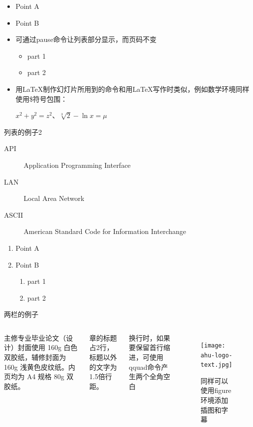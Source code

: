 \documentclass[aspectratio=169]{ahu-slide}
\begin{document}
\begin{frame}{}
    \begin{itemize}
        \item Point A
        \item Point B
        \pause
        \item 可通过pause命令让列表部分显示，而页码不变
              \begin{itemize}
                  \item part 1
                  \item part 2
              \end{itemize}
        \pause
        \item 用LaTeX制作幻灯片所用到的命令和用LaTeX写作时类似，例如数学环境同样使用\$符号包围： \par
              $x^2+y^2=z^2$、$\sqrt[3]{2}-\ln x=\mu$
    \end{itemize}
\end{frame}

\begin{frame}{列表的例子2}
    \begin{description}
        \item[API] Application Programming Interface
        \item[LAN] Local Area Network
        \item[ASCII] American Standard Code for Information Interchange
    \end{description}
    \begin{enumerate}[I]
        \item Point A
        \item Point B
              \begin{enumerate}[i]
                  \item part 1
                  \item part 2
              \end{enumerate}
    \end{enumerate}
\end{frame}

\begin{frame}{两栏的例子}
    \begin{columns}
        \qquad 主修专业毕业论文（设计）封面使用 160g 白色双胶纸，辅修封面为 160g 浅黄色皮纹纸。内页均为 A4 规格 80g 双胶纸。\par
        章的标题占2行，标题以外的文字为1.5倍行距。\par
        \qquad 换行时，如果要保留首行缩进，可使用qquad命令产生两个全角空白\par
        \begin{figure}
            \texttt{[image: ahu-logo-text.jpg]}
            \caption{同样可以使用figure环境添加插图和字幕}
        \end{figure}
    \end{columns}
\end{frame}
\end{document}
